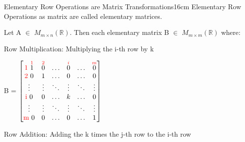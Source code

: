     \newpage



    \begin{definition}{Elementary Row Operations are Matrix Transformations}{16cm}
        Elementary Row Operations as matrix
        are called {\color{lblue} elementary matrices}.

        Let A $\in$ $M_{m \times n}(\mathbb{R})$.
        Then each elementary matrix B $\in$ $M_{m \times m}(\mathbb{R})$ where:
 
        \hspace{0.5cm}
        {\color{lgreen} Row Multiplication}:
        Multiplying the i-th row by k

        \hspace{1cm}
        B =
        $\begin{bmatrix}
            \text{\color{red} 1 } \overset{{\color{red} 1}}{1}
                & \overset{{\color{red} 2}}{0} & \hdots
                & \overset{{\color{red} i}}{0} & \hdots
                & \overset{{\color{red} m}}{0} \\
            \text{\color{red} 2 } 0 & 1 & \hdots & 0 & \hdots & 0 \\
            \vdots & \vdots & \ddots & \vdots & \ddots & \vdots \\
            \text{\color{red} i } 0 & 0 & \hdots & k & \hdots & 0 \\
            \vdots & \vdots & \ddots & \vdots & \ddots & \vdots \\
            \text{\color{red} m } 0 & 0 & \hdots & 0 & \hdots & 1
        \end{bmatrix}$

        \hspace{0.5cm}
        {\color{lgreen} Row Addition}:
        Adding the k times the j-th row to the i-th row


\end{definition}

